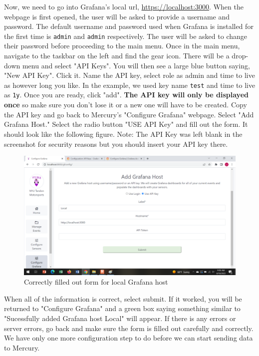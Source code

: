 \documentclass[12pt, letterpaper]{article}
\begin{document}
{{{{{{{{{{	Now, we need to go into Grafana's local url, \url{https://localhost:3000}. When the webpage is first opened, the user will be asked to provide a username and password. The default username and password used when Grafana is installed for the first time is \texttt{admin} and \texttt{admin} respectively. The user will be asked to change their password before proceeding to the main menu. Once in the main menu, navigate to the taskbar on the left and find the gear icon. There will be a drop-down menu and select "API Keys". You will then see a large blue button saying, "New API Key". Click it. Name the API key, select role as admin and time to live as however long you like. In the example, we used key name \texttt{test} and time to live as \texttt{1y}. Once you are ready, click "add". \textbf{The API key will only be displayed once} so make sure you don't lose it or a new one will have to be created. Copy the API key and go back to Mercury's "Configure Grafana" webpage. Select "Add Grafana Host." Select the radio button "USE API Key" and fill out the form. It should look like the following figure. Note: The API Key was left blank in the screenshot for security reasons but you should insert your API key there. 
	\begin{figure}[h!]
	\centering
	\includegraphics[width=1\columnwidth]{assets/grafanahost.png}
	\caption{Correctly filled out form for local Grafana host}
	\end{figure}	
	\par When all of the information is correct, select submit. If it worked, you will be returned to "Configure Grafana" and a green box saying something similar to "Sucessfully added Grafana host Local" will appear. If there is any errors or server errors, go back and make sure the form is filled out carefully and correctly. We have only one more configuration step to do before we can start sending data to Mercury. \\
	
}}}}}}}}}}
\end{document}
